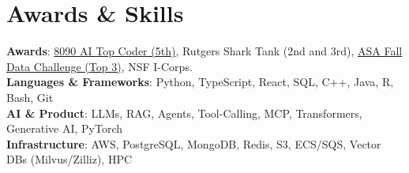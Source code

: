 \documentclass[letterpaper,11pt]{article}
\begin{document}
\section{Awards \& Skills}
 \begin{itemize}[leftmargin=0.15in, label={}]
    \small{\item{
     \textbf{Awards}{: \href{https://github.com/AkeBoss-tech/top-coder-challenge}{8090 AI Top Coder (5th)}, Rutgers Shark Tank (2nd and 3rd), \href{https://acashmoney.biz/portfolio/asa-fall-data/}{ASA Fall Data Challenge (Top 3)}, NSF I-Corps.} \\
     \textbf{Languages \& Frameworks}{: Python, TypeScript, React, SQL, C++, Java, R, Bash, Git} \\
     \textbf{AI \& Product}{: LLMs, RAG, Agents, Tool-Calling, MCP, Transformers, Generative AI, PyTorch} \\
     \textbf{Infrastructure}{: AWS, PostgreSQL, MongoDB, Redis, S3, ECS/SQS, Vector DBs (Milvus/Zilliz), HPC} \\
    }}
 \end{itemize}
\end{document}
